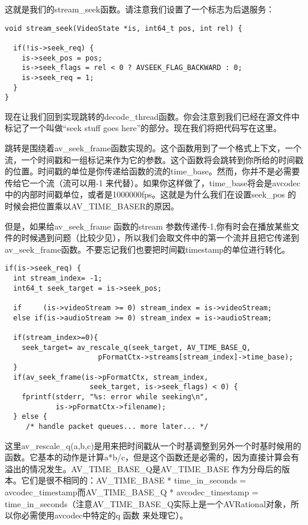 这就是我们的stream_seek函数。请注意我们设置了一个标志为后退服务：

\begin{lstlisting}
void stream_seek(VideoState *is, int64_t pos, int rel) {

  if(!is->seek_req) {
    is->seek_pos = pos;
    is->seek_flags = rel < 0 ? AVSEEK_FLAG_BACKWARD : 0;
    is->seek_req = 1;
  }
}
\end{lstlisting}

现在让我们回到实现跳转的decode_thread函数。你会注意到我们已经在源文件中标记了一个叫做“seek stuff goes here”的部分。现在我们将把代码写在这里。

跳转是围绕着av_seek_frame函数实现的。这个函数用到了一个格式上下文，一个流，一个时间戳和一组标记来作为它的参数。这个函数将会跳转到你所给的时间戳的位置。时间戳的单位是你传递给函数的流的time_base。然而，你并不是必需要传给它一个流（流可以用-1 来代替）。如果你这样做了，time_base将会是avcodec中的内部时间戳单位，或者是1000000fps。这就是为什么我们在设置seek_pos 的时候会把位置乘以AV_TIME_BASER的原因。

但是，如果给av_seek_frame 函数的stream 参数传递传-1,你有时会在播放某些文件的时候遇到问题（比较少见），所以我们会取文件中的第一个流并且把它传递到av_seek_frame函数。不要忘记我们也要把时间戳timestamp的单位进行转化。

\begin{lstlisting}
if(is->seek_req) {
  int stream_index= -1;
  int64_t seek_target = is->seek_pos;

  if     (is->videoStream >= 0) stream_index = is->videoStream;
  else if(is->audioStream >= 0) stream_index = is->audioStream;

  if(stream_index>=0){
    seek_target= av_rescale_q(seek_target, AV_TIME_BASE_Q,
                      pFormatCtx->streams[stream_index]->time_base);
  }
  if(av_seek_frame(is->pFormatCtx, stream_index,
                    seek_target, is->seek_flags) < 0) {
    fprintf(stderr, "%s: error while seeking\n",
            is->pFormatCtx->filename);
  } else {
     /* handle packet queues... more later... */
\end{lstlisting}

这里av_rescale_q(a,b,c)是用来把时间戳从一个时基调整到另外一个时基时候用的函数。它基本的动作是计算a*b/c，但是这个函数还是必需的，因为直接计算会有溢出的情况发生。AV_TIME_BASE_Q是AV_TIME_BASE 作为分母后的版本。它们是很不相同的：AV_TIME_BASE * time_in_seconds = avcodec_timestamp而AV_TIME_BASE_Q * avcodec_timestamp = time_in_seconds（注意AV_TIME_BASE_Q实际上是一个AVRational对象，所以你必需使用avcodec中特定的q 函数 来处理它）。


